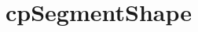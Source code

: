 \hypertarget{group__cp_segment_shape}{\section{cp\-Segment\-Shape}
\label{group__cp_segment_shape}
}
